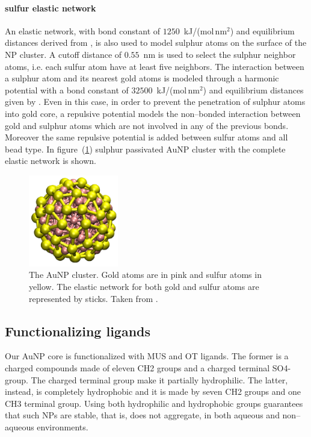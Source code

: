 \paragraph{\textbf{sulfur elastic network}} An elastic network, with bond constant of $1250$~kJ/(mol\,nm$^2$) and equilibrium distances derived from \cite{clusterEquilibrium}, is also used to model sulphur atoms on the surface of the \ac{NP} cluster. A cutoff distance of $0.55$~nm is used to select the sulphur neighbor atoms, i.e. each sulfur atom have at least five neighbors. The interaction between a sulphur atom and its nearest gold atoms is modeled through a harmonic potential with a bond constant of $32500$~kJ/(mol\,nm$^2$) and equilibrium distances given by \cite{clusterEquilibrium}. Even in this case, in order to prevent the penetration of sulphur atoms into gold core, a repulsive potential models the non--bonded interaction between gold and sulphur atoms which are not involved in any of the previous bonds. Moreover the same repulsive potential is added between sulfur atoms and all \martini bead type. In figure~(\ref{fig:NPCluster}) sulphur passivated \ac{AuNP} cluster with the complete elastic network is shown. 
\begin{figure}
	\centering
	\includegraphics[width=0.35\textwidth]{./img/NPCluster}
	\caption{The \acs{AuNP} cluster. Gold atoms are in pink and sulfur atoms in yellow. The elastic network for both gold and sulfur atoms are represented by sticks. Taken from \cite{ourPaper}.}
	\label{fig:NPCluster}
\end{figure}

\subsection{Functionalizing ligands}
Our \ac{AuNP} core is functionalized with \ac{MUS} and \ac{OT} ligands. The former is a charged compounds made of eleven \ac{CH2} groups and a charged terminal \ac{SO4-} group. The charged terminal group make it partially hydrophilic. The latter, instead, is completely hydrophobic and it is made by seven \ac{CH2} groups and one \ac{CH3} terminal group. Using both hydrophilic and hydrophobic groups guarantees that such \acp{NP} are stable, that is, does not aggregate, in both aqueous and non--aqueous environments.

